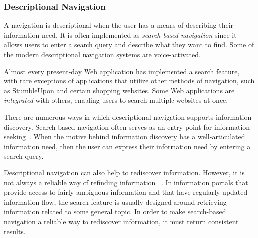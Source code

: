 \documentclass{sigchi}
\begin{document}
{{{\subsubsection{Descriptional Navigation}
A navigation is descriptional when the user has a means of describing their information need. It is often implemented as \textit{search-based navigation} since it allows users to enter a search query and describe what they want to find. Some of the modern descriptional navigation systems are voice-activated. 

Almost every present-day Web application has implemented a search feature, with rare exceptions of applications that utilize other methods of navigation, such as StumbleUpon and certain shopping websites. Some Web applications are \textit{integrated} with others, enabling users to search multiple websites at once.    

There are numerous ways in which descriptional navigation supports information discovery. Search-based navigation often serves as an entry point for information seeking~\cite{levene2011introduction}. When the motive behind information discovery has a well-articulated information need, then the user can express their information need by entering a search query. 

Descriptional navigation can also help to rediscover information. However, it is not always a reliable way of refinding information ~\cite{cockburn2003improving}. In information portals that provide access to fairly ambiguous information and that have regularly updated information flow, the search feature is usually designed around retrieving information related to some general topic. In order to make search-based navigation a reliable way to rediscover information, it must return consistent results. 
} %


}}
\end{document}
